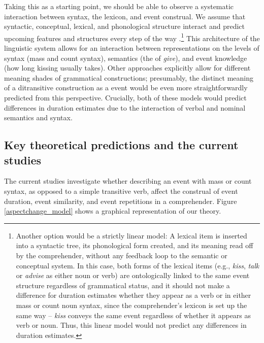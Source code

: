 \documentclass[preprint,12pt,authoryear]{elsarticle}
\begin{document}
Taking this as a starting point, we should be able to observe a systematic interaction between syntax, the lexicon, and event construal. We assume that syntactic, conceptual, lexical, and phonological structure interact and predict upcoming features and structures every step of the way \citep{Jackendoff2007a,Jackendoff2002,GarrodPickering2003,levy2008,martin2016language}.\footnote{Another option would be a strictly linear model: A lexical item is inserted into a syntactic tree, its phonological form created, and its meaning read off by the comprehender, without any feedback loop to the semantic or conceptual system. In this case, both forms of the lexical items (e.g., \emph{kiss}, \emph{talk} or \emph{advise} as either noun or verb) are ontologically linked to the same event structure regardless of grammatical status, and it should not make a difference for duration estimates whether they appear as a verb or in either mass or count noun syntax, since the comprehender's lexicon is set up the same way -- \emph{kiss} conveys the same event regardless of whether it appears as verb or noun. Thus, this linear model would not predict any differences in duration estimates.} This architecture of the linguistic system allows for an interaction between representations on the levels of syntax (mass and count syntax), semantics (the  of \emph{give}), and event knowledge (how long kissing usually takes). Other approaches \citep{goldberg2003,Goldberg1995} explicitly allow for different meaning shades of grammatical constructions; presumably, the distinct meaning of a ditransitive construction as a  event would be even more straightforwardly predicted from this perspective. Crucially, both of these models would predict differences in duration estimates due to the interaction of verbal and nominal semantics and syntax.

\subsection{Key theoretical predictions and the current studies}\label{sec_predictions}
The current studies investigate whether describing an event with mass or count syntax, as opposed to a simple transitive verb, affect the construal of event duration, event similarity, and event repetitions in a comprehender. Figure \ref{aspectchange_model} shows a graphical representation of our theory.
\end{document}
